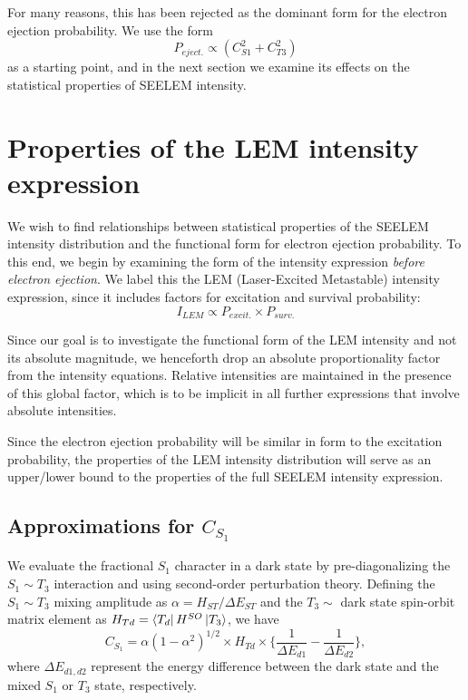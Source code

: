 \documentclass{article}
\begin{document}
For many reasons, this has been rejected as the dominant form for the
electron ejection probability. We use the form
\begin{equation}
P_{eject.} \propto (C_{S1}^2 + C_{T3}^2)
\end{equation}
as a starting point, and in the next section we examine its effects on
the statistical properties of SEELEM intensity.

\section{Properties of the LEM intensity expression}

We wish to find relationships between statistical properties of the
SEELEM intensity distribution and the functional form for electron
ejection probability. To this end, we begin by examining the form of
the intensity expression \emph{before electron ejection}. We label
this the LEM (Laser-Excited Metastable) intensity expression, since it
includes factors for excitation and survival probability:
\begin{equation}
I_{LEM} \propto P_{excit.} \times P_{surv.}
\end{equation}

Since our goal is to investigate the functional form of the LEM
intensity and not its absolute magnitude, we henceforth drop an
absolute proportionality factor from the intensity equations. Relative
intensities are maintained in the presence of this global factor,
which is to be implicit in all further expressions that involve
absolute intensities.

Since the electron ejection probability will be similar in form to the
excitation probability, the properties of the LEM intensity
distribution will serve as an upper/lower bound to the properties of
the full SEELEM intensity expression.

\subsection{Approximations for $C_{S_1}$}

We evaluate the fractional $S_1$ character in a dark state by
pre-diagonalizing the $S_1 \sim T_3$ interaction and using
second-order perturbation theory. Defining the $S_1 \sim T_3$ mixing
amplitude as $\alpha = H_{ST} / \Delta E_{ST}$ and the $T_3 \sim$ dark
state spin-orbit matrix element as $H_{Td} =
\mathinner{\langle{T_d}|}H^{SO}\mathinner{|{T_3}\rangle}$, we have
\begin{equation}
C_{S_1} = \alpha (1 - \alpha^2)^{1/2} \times H_{Td} \times \biggl\lbrace
  \frac{1}{\Delta E_{d1}} - \frac{1}{\Delta E_{d2}} \biggr\rbrace ,
\end{equation}
where $\Delta E_{d1,d2}$ represent the energy difference between the
dark state and the mixed $S_1$ or $T_3$ state, respectively.
\end{document}

